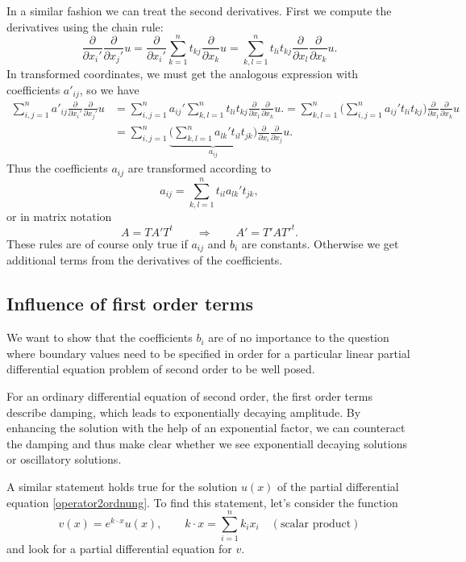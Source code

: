 In a similar fashion we can treat the second derivatives.
First we compute the derivatives using the chain rule:
\[
\frac{\partial}{\partial x_i'}\frac{\partial}{\partial x_j'} u
=
\frac{\partial}{\partial x_i'}
\sum_{k=1}^nt_{kj}\frac{\partial}{\partial x_k}u
=
\sum_{k,l=1}^nt_{li}t_{kj}\frac{\partial}{\partial x_l}\frac{\partial}{\partial x_k}u.
\]
In transformed coordinates, we must get the analogous expression
with coefficients $a'_{ij}$, so we have
\begin{align*}
\sum_{i,j=1}^n
a'_{ij}\frac{\partial}{\partial x_i'}\frac{\partial}{\partial x_j'} u
&=
\sum_{i,j=1}^n
a_{ij}'
\sum_{k,l=1}^n
t_{li}t_{kj}\frac{\partial}{\partial x_l}\frac{\partial}{\partial x_k}u.
=
\sum_{k,l=1}^n
\biggl(
\sum_{i,j=1}^n
a_{ij}'
t_{li}t_{kj}
\biggr)
\frac{\partial}{\partial x_l}\frac{\partial}{\partial x_k}u
\\
&=
\sum_{i,j=1}^n
\underbrace{
\biggl(
\sum_{k,l=1}^n
a_{lk}'
t_{il}t_{jk}
\biggr)}_{\textstyle a_{ij}}
\frac{\partial}{\partial x_i}\frac{\partial}{\partial x_j}u.
\end{align*}
Thus the coefficients
$a_{ij}$ are transformed according to
\[
a_{ij}=\sum_{k,l=1}^n t_{il}a_{lk}'t_{jk},
\]
or in matrix notation
\[
A=TA'T^t
\qquad\Rightarrow\qquad
A'=T'AT'^t.
\]
These rules are of course only true if 
$a_{ij}$ and $b_i$ are constants.
Otherwise we get additional terms from the derivatives of the coefficients.

\subsection{Influence of first order terms
\label{einfluss-terme-erster-ordnung}}
We want to show that the coefficients $b_i$ are of no importance to
the question where boundary values need to be specified in order
for a particular linear partial differential equation problem
of second order to be well posed.

For an ordinary differential equation of second order, the first
order terms describe damping, which leads to exponentially decaying
amplitude.
By enhancing the solution with the help of an exponential factor,
we can counteract the damping and thus make clear whether we see
exponentiall decaying solutions or oscillatory solutions.

A similar statement holds true for the solution $u(x)$
of the partial differential equation
\eqref{operator2ordnung}.
To find this statement, let's consider the function
\[
v(x)=e^{k\cdot x} u(x),
\qquad
k\cdot x = \sum_{i=1}^n k_ix_i \quad(\text{scalar product})
\]
and look for a partial differential equation for $v$.

